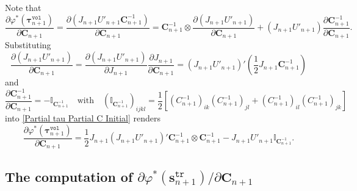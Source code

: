 \documentclass[preprint,11pt]{elsarticle}
\theoremstyle{definition}
\begin{document}
Note that
\begin{equation} \label{Partial tau Partial C Initial}
    \dfrac{\partial \varphi^*(\boldsymbol{\tau}_{n+1}^\texttt{vol})}{\partial \mathbf{C}_{n+1}}
    = \dfrac{\partial \left( J_{n+1} U'_{n+1} \mathbf{C}_{n+1}^{-1} \right)}{\partial \mathbf{C}_{n+1}}
    = \mathbf{C}_{n+1}^{-1} \otimes \dfrac{\partial (J_{n+1} U'_{n+1})}{\partial \mathbf{C}_{n+1}} 
    + (J_{n+1} U'_{n+1}) \dfrac{\partial \mathbf{C}_{n+1}^{-1}}{\partial \mathbf{C}_{n+1}}.
\end{equation}
Substituting
\begin{equation*}
    \dfrac{\partial (J_{n+1} U'_{n+1})}{\partial \mathbf{C}_{n+1}}
    = \dfrac{\partial (J_{n+1} U'_{n+1})}{\partial J_{n+1}}
    \dfrac{\partial J_{n+1}}{\partial \mathbf{C}_{n+1}}
    = (J_{n+1} U'_{n+1})' \left( \dfrac{1}{2} J_{n+1} \mathbf{C}_{n+1}^{-1} \right)
\end{equation*}
and
\begin{equation*}
    \dfrac{\partial \mathbf{C}_{n+1}^{-1}}{\partial \mathbf{C}_{n+1}}
    = - \mathbb{I}_{\mathbf{C}_{n+1}^{-1}}
    \quad \text{with} \quad
    \left( \mathbb{I}_{\mathbf{C}_{n+1}^{-1}} \right)_{ijkl} = \dfrac{1}{2} \left[ \left( C_{n+1}^{-1} \right)_{ik} \left( C_{n+1}^{-1} \right)_{jl} + \left( C_{n+1}^{-1} \right)_{il} \left( C_{n+1}^{-1} \right)_{jk} \right]
\end{equation*}
into \eqref{Partial tau Partial C Initial} renders
\begin{equation} \label{Partial tau Partial C Final}
    \dfrac{\partial \varphi^*(\boldsymbol{\tau}_{n+1}^\texttt{vol})}{\partial \mathbf{C}_{n+1}}
    = \dfrac{1}{2} J_{n+1} (J_{n+1} U'_{n+1})' \mathbf{C}_{n+1}^{-1} \otimes \mathbf{C}_{n+1}^{-1}
    - J_{n+1} U'_{n+1} \mathbb{I}_{\mathbf{C}_{n+1}^{-1}}.
\end{equation}

\subsection[]{The computation of $\partial \varphi^*(\mathbf{s}_{n+1}^\texttt{tr}) / \partial \mathbf{C}_{n+1}$} 
\end{document}
